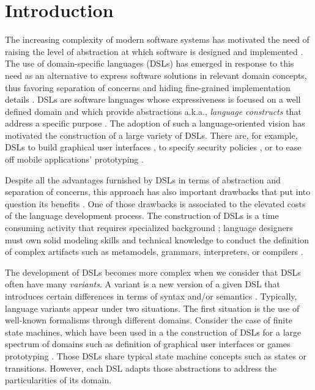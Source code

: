 \section{Introduction}

The increasing complexity of modern software systems has motivated the need of raising the level of abstraction at which software is designed and implemented \cite{Chechik:2010}. The use of domain-specific languages (DSLs) has emerged in response to this need as an alternative to express software solutions in relevant domain concepts, thus favoring separation of concerns and hiding fine-grained implementation details \cite{Jezequel:2014}. DSLs are software languages whose expressiveness is focused on a well defined domain and which provide abstractions a.k.a., \textit{language constructs} that address a specific purpose \cite{Mernik:2005b}. The adoption of such a language-oriented vision has motivated the construction of a large variety of DSLs. There are, for example, DSLs to build graphical user interfaces \cite{Oney:2012}, to specify security policies \cite{Lodderstedt:2002}, or to ease off mobile applications' prototyping \cite{Ribeiro:2014}.

Despite all the advantages furnished by DSLs in terms of abstraction and separation of concerns, this approach has also important drawbacks that put into question its benefits \cite{Gray:2008}. One of those drawbacks is associated to the elevated costs of the language development process. The construction of DSLs is a time consuming activity that requires specialized background \cite{Jezequel:2014}; language designers must own solid modeling skills and technical knowledge to conduct the definition of complex artifacts such as metamodels, grammars, interpreters, or compilers \cite{Jezequel:2014}.

The development of DSLs becomes more complex when we consider that DSLs often have many \textit{variants}. A variant is a new version of a given DSL that introduces certain differences in terms of syntax and/or semantics \cite{Homer:2014}. Typically, language variants appear under two situations. The first situation is the use of well-known formalisms through different domains. Consider the case of finite state machines, which have been used in a the construction of DSLs for a large spectrum of domains such as definition of graphical user interfaces \cite{Oney:2012} or games prototyping \cite{Funk:2012}. Those DSLs share typical state machine concepts such as states or transitions. However, each DSL adapts those abstractions to address the particularities of its domain. 

